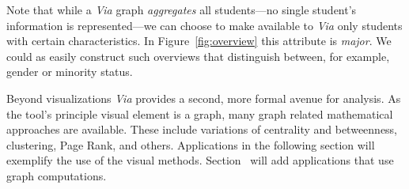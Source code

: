 Note that while a {\em Via} graph {\em aggregates} all students---no
single student's information is represented---we can choose to make
available to {\em Via} only students with certain characteristics. In
Figure~\ref{fig:overview} this attribute is {\em major}. We could as
easily construct such overviews that distinguish between, for example,
gender or minority status.

Beyond visualizations {\em Via} provides a second, more formal avenue
for analysis. As the tool's principle visual element is a graph, many
graph related mathematical approaches are available. These include
variations of centrality and betweenness, clustering, Page Rank, and
others. Applications in the following section will exemplify the use
of the visual methods. Section~ will add
applications that use graph computations.
